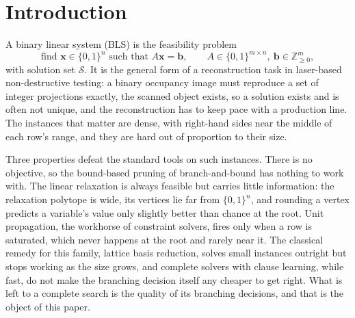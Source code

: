 \documentclass[final,5p,times,twocolumn,authoryear]{elsarticle}
\newcommand{\SOL}{\mathcal{S}}
\begin{document}
\section{Introduction}
\label{sec:intro}

A binary linear system (BLS) is the feasibility problem
\begin{equation}
\text{find } \mathbf{x}\in\{0,1\}^n \text{ such that } A\mathbf{x}=\mathbf{b},\qquad A\in\{0,1\}^{m\times n},\ \mathbf{b}\in\mathbb{Z}_{\ge0}^m,
\label{eq:bls}
\end{equation}
with solution set $\SOL$. It is the general form of a reconstruction task in laser-based non-destructive testing: a binary occupancy image must reproduce a set of integer projections exactly, the scanned object exists, so a solution exists and is often not unique, and the reconstruction has to keep pace with a production line. The instances that matter are dense, with right-hand sides near the middle of each row's range, and they are hard out of proportion to their size.

Three properties defeat the standard tools on such instances. There is no objective, so the bound-based pruning of branch-and-bound has nothing to work with. The linear relaxation is always feasible but carries little information: the relaxation polytope is wide, its vertices lie far from $\{0,1\}^n$, and rounding a vertex predicts a variable's value only slightly better than chance at the root. Unit propagation, the workhorse of constraint solvers, fires only when a row is saturated, which never happens at the root and rarely near it. The classical remedy for this family, lattice basis reduction, solves small instances outright but stops working as the size grows, and complete solvers with clause learning, while fast, do not make the branching decision itself any cheaper to get right. What is left to a complete search is the quality of its branching decisions, and that is the object of this paper.
\end{document}
